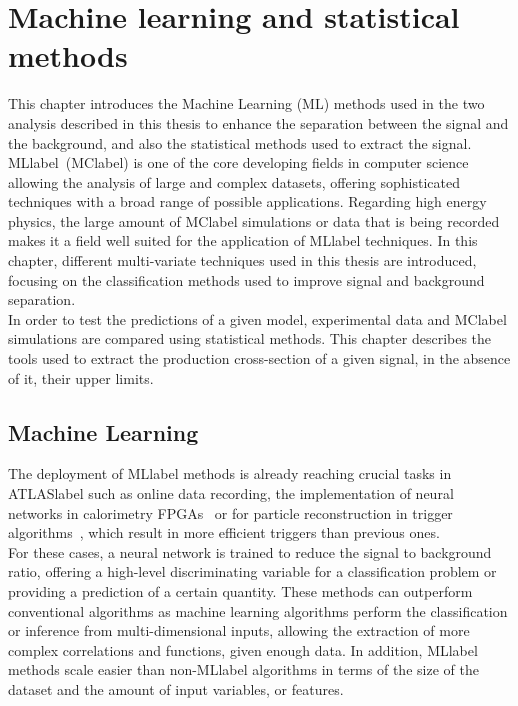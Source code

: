 \chapter{Machine learning and statistical methods}
\label{chapter:MLStat}

This chapter introduces the Machine Learning (ML) methods used in the two analysis described in this thesis to enhance the separation between the signal and the background, and also the statistical methods used to extract the signal.\\

\acrlong{MLlabel}~(\acrshort{MClabel}) is one of the core developing fields in computer science allowing the analysis of large and complex datasets, offering sophisticated techniques with a broad range of possible applications. Regarding high energy physics, the large amount of \acrshort{MClabel} simulations or data that is being recorded makes it a field well suited for the application of \acrshort{MLlabel} techniques. In this chapter, different multi-variate techniques used in this thesis are introduced, focusing on the classification methods used to improve signal and background separation.\\

In order to test the predictions of a given model, experimental data and \acrshort{MClabel} simulations are compared using statistical methods. This chapter describes the tools used to extract the production cross-section of a given signal, in the absence of it, their upper limits.

\section{Machine Learning}

The deployment of \acrshort{MLlabel} methods is already reaching crucial tasks in \acrshort{ATLASlabel} such as online data recording, the implementation of neural networks in calorimetry FPGAs~\cite{Laatu:2022fni} or for particle reconstruction in trigger algorithms~\cite{ATLAS:2019uhp}, which result in more efficient triggers than previous ones.\\

For these cases, a neural network is trained to reduce the signal to background ratio, offering a high-level discriminating variable for a classification problem or providing a prediction of a certain quantity. These methods can outperform conventional algorithms as machine learning algorithms perform the classification or inference from multi-dimensional inputs, allowing the extraction of more complex correlations and functions, given enough data. In addition, \acrshort{MLlabel} methods scale easier than non-\acrshort{MLlabel} algorithms in terms of the size of the dataset and the amount of input variables, or features.\\

